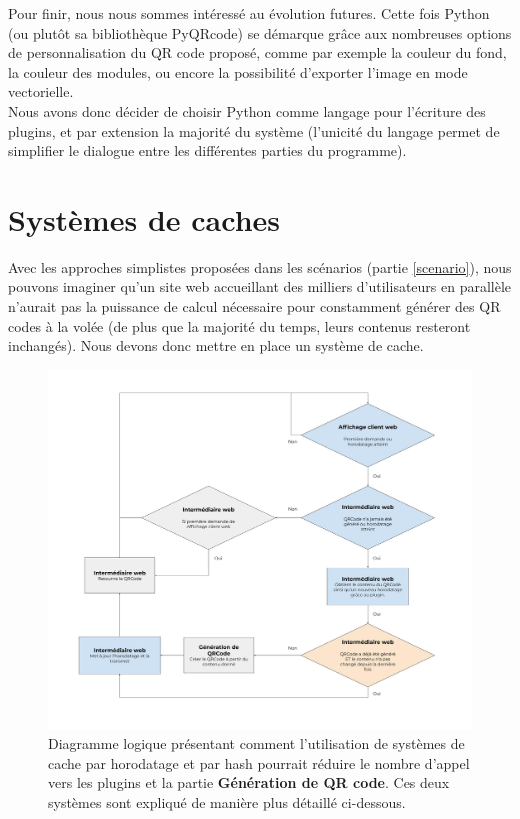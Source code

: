 \documentclass[a4paper,12pt]{article}
\begin{document}
\begin{itemize}
  Pour finir, nous nous sommes intéressé au évolution futures. Cette fois Python (ou plutôt sa bibliothèque PyQRcode) se démarque grâce aux nombreuses options de personnalisation du QR code proposé, comme par exemple la couleur du fond, la couleur des modules, ou encore la possibilité d'exporter l'image en mode vectorielle.\\
  
  Nous avons donc décider de choisir Python comme langage pour l'écriture des plugins, et par extension la majorité du système (l'unicité du langage permet de simplifier le dialogue entre les différentes parties du programme).\\
  
\end{itemize}

\newpage
\section{Systèmes de caches}

Avec les approches simplistes proposées dans les scénarios (partie \ref{scenario}), nous pouvons imaginer qu'un site web accueillant des milliers d'utilisateurs en parallèle n'aurait pas la puissance de calcul nécessaire pour constamment générer des QR codes à la volée (de plus que la majorité du temps, leurs contenus resteront inchangés). Nous devons donc mettre en place un système de cache.


\begin{figure}[H]
    \centering
    \includegraphics[width=.8\textwidth]{Logique cache.jpg}
    \caption{Diagramme logique présentant comment l'utilisation de systèmes de cache par horodatage et par hash pourrait réduire le nombre d'appel vers les plugins et la partie \textbf{Génération de QR code}. Ces deux systèmes sont expliqué de manière plus détaillé ci-dessous.}
\end{figure}
\end{document}
